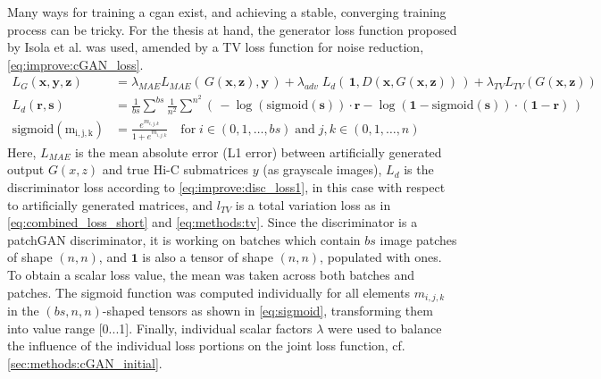Many ways for training a \acrshort{cgan} exist, and achieving a stable, converging training process can be tricky.
For the thesis at hand, the generator loss function proposed by Isola et al. \cite{Isola2017} was used, 
amended by a TV loss function for noise reduction, \cref{eq:improve:cGAN_loss}.
\begin{align}
 L_G(\mathbf{x}, \mathbf{y}, \mathbf{z}) &=\lambda_\mathit{MAE}L_\mathit{MAE}(\,G(\mathbf{x},\mathbf{z}), \mathbf{y}\,) 
    + \lambda_\mathit{adv} \; L_d(\, \mathbf{1}, D(\mathbf{x}, G(\mathbf{x},\mathbf{z})) \,) 
    +  \lambda_\mathit{TV}L_\mathit{TV}(G(\mathbf{x},\mathbf{z})) \label{eq:improve:cGAN_loss}\\
 L_d(\mathbf{r, s}) &= \frac{1}{bs}\sum^{bs} \frac{1}{n^2}\sum^{n^2}
    \left(\, -\log(\mathrm{sigmoid}(\mathbf{s})) \cdot \mathbf{r} - \log(\mathbf{1} - \mathrm{sigmoid}(\mathbf{s})) \cdot (\mathbf{1} - \mathbf{r}) \,\right) \label{eq:improve:disc_loss1}\\
 \mathrm{sigmoid(m_{i,j,k})} &= \frac{e^{m_{i,j,k}}}{1+e^{m_{i,j,k}}} \quad \mathrm{for}\; i \in (0, 1, \dots, bs)\; \textrm{and}\; j,k \in (0, 1, \dots, n) \label{eq:sigmoid}
\end{align}
Here, $L_\mathit{MAE}$ is the mean absolute error (L1 error) between artificially generated output $G(x,z)$ and true Hi-C submatrices $y$ (as grayscale images), 
$L_d$ is the discriminator loss according to \cref{eq:improve:disc_loss1}, in this case with respect to artificially generated matrices, and 
$l_\mathit{TV}$ is a total variation loss as in \cref{eq:combined_loss_short} and \cref{eq:methods:tv}.
Since the discriminator is a patchGAN discriminator, it is working on batches which contain $bs$ image patches of shape $(n,n)$, and $\mathbf{1}$ is also a tensor of shape $(n,n)$, populated with ones.
To obtain a scalar loss value, the mean was taken across both batches and patches. 
The sigmoid function was computed individually for all elements $m_{i,j,k}$ in the $(bs,n,n)$-shaped tensors as shown in \cref{eq:sigmoid}, transforming them into value range [0...1].
Finally, individual scalar factors $\lambda$ were used to balance the influence of the individual loss portions on the joint loss function, cf. \cref{sec:methods:cGAN_initial}.

